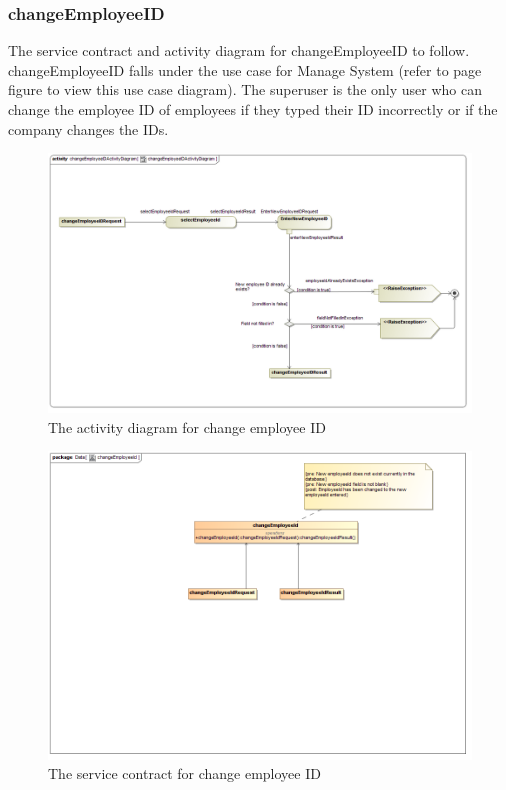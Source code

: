 \documentclass[a4paper,12pt]{article}
\begin{document}
\subsubsection{changeEmployeeID}
The service contract and activity diagram for changeEmployeeID to follow. changeEmployeeID falls under the use case for Manage System (refer to page   figure   to view this use case diagram). The superuser is the only user who can change the employee ID of employees if they typed their ID incorrectly or if the company changes the IDs.
\begin{figure}[H]
  \centering
    \includegraphics[width=1.0\textwidth]{../images/changeEmployeeIDActivityDiagram.png}
    \caption{The activity diagram for change employee ID} 
\end{figure}

\begin{figure}[H]
	\centering
	\includegraphics[width=1.0\textwidth]{../images/changeEmployeeIdSC.png}
	\caption{The service contract for change employee ID}
\end{figure}
\end{document}
